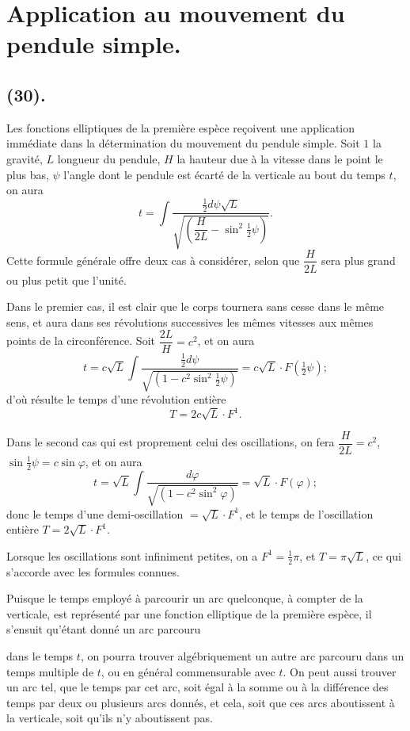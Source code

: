 \documentclass{article}
\begin{document}
\section*{Application au mouvement du pendule simple.}

\subsection*{(30).}

Les fonctions elliptiques de la première espèce reçoivent une application immédiate dans la détermination du mouvement du pendule simple. Soit $1$ la gravité, $L$ longueur du pendule, $H$ la hauteur due à la vitesse dans le point le plus bas, $\psi$ l'angle dont le pendule est écarté de la verticale au bout du temps $t$, on aura
\[ t=\int\frac{\tfrac{1}{2}d\psi\sqrt{L}}{\sqrt{\left(\dfrac{H}{2L}-\sin^{2}\tfrac{1}{2}\psi\right)}}. \]
Cette formule générale offre deux cas à considérer, selon que $\dfrac{H}{2L}$ sera plus grand ou plus petit que l'unité.

Dans le premier cas, il est clair que le corps tournera sans cesse dans le même sens, et aura dans ses révolutions successives les mêmes vitesses aux mêmes points de la circonférence. Soit $\dfrac{2L}{H}=c^{2}$, et on aura
\[ t=c\sqrt{L}\int\frac{\tfrac{1}{2}d\psi}{\sqrt{(1-c^{2}\sin^{2}\tfrac{1}{2}\psi)}}=c\sqrt{L}\cdot F(\tfrac{1}{2}\psi); \]
d'où résulte le temps d'une révolution entière
\[ T=2c\sqrt{L}\cdot F^{1}. \]

Dans le second cas qui est proprement celui des oscillations, on fera $\dfrac{H}{2L}=c^{2}$, $\sin\frac{1}{2}\psi=c\sin\varphi$, et on aura
\[ t=\sqrt{L}\int\frac{d\varphi}{\sqrt{(1-c^{2}\sin^{2}\varphi)}}=\sqrt{L}\cdot F(\varphi); \]
donc le temps d'une demi-oscillation $=\sqrt{L}\cdot F^{1}$, et le temps de l'oscillation entière $T=2\sqrt{L}\cdot F^{1}$.

Lorsque les oscillations sont infiniment petites, on a $F^{1}=\frac{1}{2}\pi$, et $T=\pi\sqrt{L}$, ce qui s'accorde avec les formules connues.

Puisque le temps employé à parcourir un arc quelconque, à compter de la verticale, est représenté par une fonction elliptique de la première espèce, il s'ensuit qu'étant donné un arc parcouru

dans le temps $t$, on pourra trouver algébriquement un autre arc parcouru dans un temps multiple de $t$, ou en général commensurable avec $t$. On peut aussi trouver un arc tel, que le temps par cet arc, soit égal à la somme ou à la différence des temps par deux ou plusieurs arcs donnés, et cela, soit que ces arcs aboutissent à la verticale, soit qu'ils n'y aboutissent pas.
\end{document}
